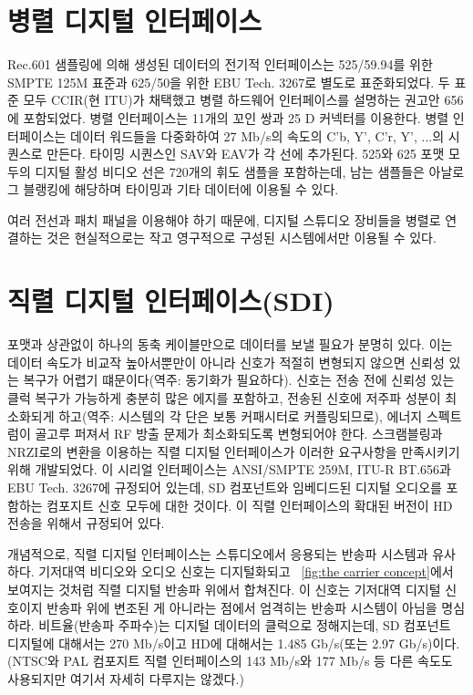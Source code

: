 \section{병렬 디지털 인터페이스}
Rec.601 샘플링에 의해 생성된 데이터의 전기적 인터페이스는 525/59.94를 위한 SMPTE 125M 표준과 625/50을 위한 EBU Tech. 3267로 별도로 표준화되었다. 두 표준 모두 CCIR(현 ITU)가 채택했고 병렬 하드웨어 인터페이스를 설명하는 권고안 656에 포함되었다.
병렬 인터페이스는 11개의 꼬인 쌍과 25 D 커넥터를 이용한다. 병렬 인터페이스는 데이터 워드들을 다중화하여 27 Mb/s의 속도의 C'b, Y', C'r, Y', ...의 시퀀스로 만든다. 타이밍 시퀀스인 SAV와 EAV가 각 선에 추가된다.
525와 625 포맷 모두의 디지털 활성 비디오 선은 720개의 휘도 샘플을 포함하는데, 남는 샘플들은 아날로그 블랭킹에 해당하며 타이밍과 기타 데이터에 이용될 수 있다.


여러 전선과 패치 패널을 이용해야 하기 때문에, 디지털 스튜디오 장비들을 병렬로 연결하는 것은 현실적으로는 작고 영구적으로 구성된 시스템에서만 이용될 수 있다.

\section{직렬 디지털 인터페이스(SDI)}
포맷과 상관없이 하나의 동축 케이블만으로 데이터를 보낼 필요가 분명히 있다. 이는 데이터 속도가 비교작 높아서뿐만이 아니라 신호가 적절히 변형되지 않으면 신뢰성 있는 복구가 어렵기 떄문이다(역주: 동기화가 필요하다).
신호는 전송 전에 신뢰성 있는 클럭 복구가 가능하게 충분히 많은 에지를 포함하고, 전송된 신호에 저주파 성분이 최소화되게 하고(역주: 시스템의 각 단은 보통 커패시터로 커플링되므로), 에너지 스펙트럼이 골고루 퍼져서 RF 방출 문제가 최소화되도록 변형되어야 한다.
스크램블링과 NRZI로의 변환을 이용하는 직렬 디지털 인터페이스가 이러한 요구사항을 만족시키기 위해 개발되었다. 이 시리얼 인터페이스는 ANSI/SMPTE 259M, ITU-R BT.656과 EBU Tech. 3267에 규정되어 있는데, SD 컴포넌트와 임베디드된 디지털 오디오를 포함하는 컴포지트 신호 모두에 대한 것이다.
이 직렬 인터페이스의 확대된 버전이 HD 전송을 위해서 규정되어 있다.

개념적으로, 직렬 디지털 인터페이스는 스튜디오에서 응용되는 반송파 시스템과 유사하다. 기저대역 비디오와 오디오 신호는 디지털화되고 \figurename~\ref{fig:the carrier concept}에서 보여지는 것처럼 직렬 디지털 반송파 위에서 합쳐진다.
이 신호는 기저대역 디지털 신호이지 반송파 위에 변조된 게 아니라는 점에서 엄격히는 반송파 시스템이 아님을 명심하라.
비트율(반송파 주파수)는 디지털 데이터의 클럭으로 정해지는데, SD 컴포넌트 디지털에 대해서는 270 Mb/s이고 HD에 대해서는 1.485 Gb/s(또는 2.97 Gb/s)이다. (NTSC와 PAL 컴포지트 직렬 인터페이스의 143 Mb/s와 177 Mb/s 등 다른 속도도 사용되지만 여기서 자세히 다루지는 않겠다.)

